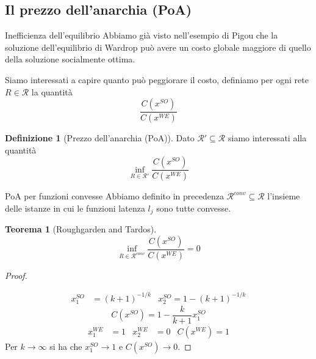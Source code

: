 \documentclass{beamer}
\newcounter{counter1}
\theoremstyle{plain}
\newtheorem{myteo}[counter1]{Teorema}
\theoremstyle{definition}
\newtheorem{mydef}[counter1]{Definizione}
\theoremstyle{remark}
\newcommand{\pa}[1]{\left(#1\right)}
\begin{document}
\subsection{Il prezzo dell'anarchia (PoA)}

\begin{frame}{Inefficienza dell'equilibrio}
  Abbiamo già visto nell'esempio di Pigou che la soluzione
  dell'equilibrio di Wardrop può avere un costo globale maggiore di
  quello della soluzione socialmente ottima.

  Siamo interessati a capire quanto può peggiorare il costo, definiamo
  per ogni rete $R \in \mathcal{R}$ la quantità
  \[ \frac{C\pa{ x^{SO}}}{C\pa{ x^{WE}}} \]
  \begin{mydef}[Prezzo dell'anarchia (PoA)]
    Dato $\mathcal{R}' \subseteq \mathcal{R}$ siamo interessati alla
    quantità
    \[ \inf _{R\in \mathcal{R}'} \frac{C\pa{ x^{SO}}}{C\pa{
          x^{WE}}} \]
  \end{mydef}
\end{frame}

\begin{frame}{PoA per funzioni convesse}
  Abbiamo definito in precedenza $\mathcal{R}^{conv} \subseteq
  \mathcal{R}$ l'insieme delle istanze in cui le funzioni latenza
  $l_j$ sono tutte convesse.
  \begin{myteo}[Roughgarden and Tardos]
    \[ \inf _{R\in \mathcal{R}^{conv}} \frac{C\pa{ x^{SO}}}{C\pa{
          x^{WE}}} = 0 \]
  \end{myteo}
\end{frame}

\begin{frame}
  \begin{proof}
    \begin{center}
    \end{center}
    \vspace{-25px}
    \begin{align*}
      x^{SO}_1 &= \pa{k+1}^{-1/k} & x^{SO}_2 = 1- \pa{k+1}^{-1/k}
    \end{align*}
    \[ C\pa{x^{SO}} = 1 - \frac{k}{k+1}x^{SO}_1 \]
    \begin{align*}
      x^{WE}_1 &= 1 & x^{WE}_2 &= 0 & C\pa{x^{WE}} = 1
    \end{align*}
    Per $k\to \infty$ si ha che $x^{SO}_1 \to 1$ e $C\pa{x^{SO}}\to 0$.
  \end{proof}
\end{frame}
\end{document}
